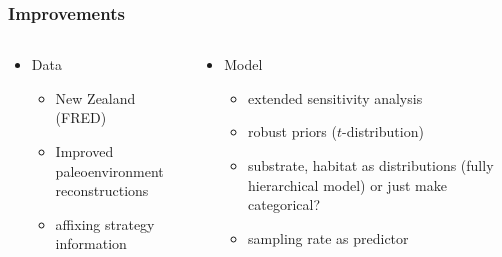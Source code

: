 \documentclass{beamer}
\begin{document}
\begin{frame}
  \frametitle{Improvements}
  \begin{columns}
    \begin{column}{0.5\textwidth}
      \begin{itemize}
        \item Data
          \begin{itemize}
            \item New Zealand (FRED)
            \item Improved paleoenvironment reconstructions
            \item affixing strategy information
          \end{itemize}
      \end{itemize}
    \end{column}
    \begin{column}{0.5\textwidth}
      \begin{itemize}
        \item Model
          \begin{itemize}
            \item extended sensitivity analysis
            \item robust priors (\(t\)-distribution)
            \item substrate, habitat as distributions (fully hierarchical model) or just make categorical?
            \item sampling rate as predictor
          \end{itemize}
      \end{itemize}
    \end{column}
  \end{columns}
\end{frame}
\end{document}
